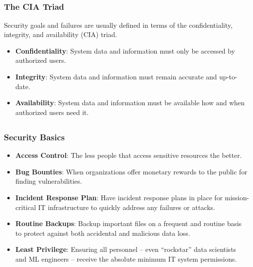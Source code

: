 \documentclass[11pt,
               aspectratio=169,
               hyperref={colorlinks}
               ]{beamer}
\begin{document}
	\subsection*{}
	\begin{frame}
		
		\frametitle{The CIA Triad}
		
		Security goals and failures are usually defined in terms of the confidentiality, integrity, and availability (CIA) triad.
		
		\begin{itemize}
			\item \textbf{Confidentiality}: System data and information must only be accessed by authorized users.
			\item \textbf{Integrity}: System data and information must remain accurate and up-to-date.
			\item \textbf{Availability}: System data and information must be available how and when authorized users need it.
		\end{itemize}

	\end{frame}	

	\subsection*{}
	\begin{frame}
		
		\frametitle{Security Basics}
		
		\begin{itemize}
			\item \textbf{Access Control}: The less people that access sensitive resources the better.
			\item \textbf{Bug Bounties}: When organizations offer monetary rewards to the public for finding vulnerabilities.
			\item \textbf{Incident Response Plan}: Have incident response plans in place for mission-critical IT infrastructure to quickly address any failures or attacks.
			\item \textbf{Routine Backups}: Backup important files on a frequent and routine basis to protect against both accidental and malicious data loss.	
			\item \textbf{Least Privilege}: Ensuring all personnel -- even “rockstar” data scientists and ML engineers -- receive the absolute minimum IT system permissions.
		\end{itemize}

	\end{frame}
\end{document}
